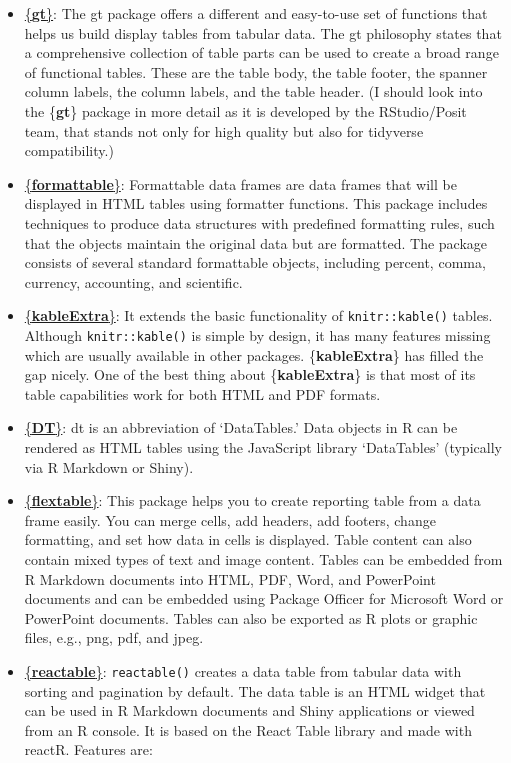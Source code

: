 \documentclass[
  letterpaper,
  DIV=11,
  numbers=noendperiod]{scrreprt}
\begin{document}
\begin{itemize}
\item
  \href{https://gt.rstudio.com/}{\{\textbf{gt}\}}: The gt package offers
  a different and easy-to-use set of functions that helps us build
  display tables from tabular data. The gt philosophy states that a
  comprehensive collection of table parts can be used to create a broad
  range of functional tables. These are the table body, the table
  footer, the spanner column labels, the column labels, and the table
  header. (I should look into the \{\textbf{gt}\} package in more detail
  as it is developed by the RStudio/Posit team, that stands not only for
  high quality but also for tidyverse compatibility.)

  
\item
  \href{https://renkun-ken.github.io/formattable/}{\{\textbf{formattable}\}}:
  Formattable data frames are data frames that will be displayed in HTML
  tables using formatter functions. This package includes techniques to
  produce data structures with predefined formatting rules, such that
  the objects maintain the original data but are formatted. The package
  consists of several standard formattable objects, including percent,
  comma, currency, accounting, and scientific.
\item
  \href{https://haozhu233.github.io/kableExtra/}{\{\textbf{kableExtra}\}}:
  It extends the basic functionality of \texttt{knitr::kable()} tables.
  Although \texttt{knitr::kable()} is simple by design, it has many
  features missing which are usually available in other packages.
  \{\textbf{kableExtra}\} has filled the gap nicely. One of the best
  thing about \{\textbf{kableExtra}\} is that most of its table
  capabilities work for both HTML and PDF formats.
\item
  \href{https://rstudio.github.io/DT/}{\{\textbf{DT}\}}: dt is an
  abbreviation of `DataTables.' Data objects in R can be rendered as
  HTML tables using the JavaScript library `DataTables' (typically via R
  Markdown or Shiny).
\item
  \href{https://davidgohel.github.io/flextable/}{\{\textbf{flextable}\}}:
  This package helps you to create reporting table from a data frame
  easily. You can merge cells, add headers, add footers, change
  formatting, and set how data in cells is displayed. Table content can
  also contain mixed types of text and image content. Tables can be
  embedded from R Markdown documents into HTML, PDF, Word, and
  PowerPoint documents and can be embedded using Package Officer for
  Microsoft Word or PowerPoint documents. Tables can also be exported as
  R plots or graphic files, e.g., png, pdf, and jpeg.
\item
  \href{https://glin.github.io/reactable/}{\{\textbf{reactable}\}}:
  \texttt{reactable()} creates a data table from tabular data with
  sorting and pagination by default. The data table is an HTML widget
  that can be used in R Markdown documents and Shiny applications or
  viewed from an R console. It is based on the React Table library and
  made with reactR. Features are:


\end{itemize}
\end{document}
